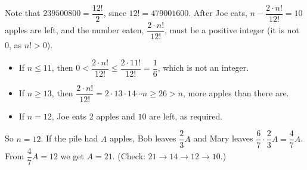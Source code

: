 Note that $239500800=\dfrac{12!}{2}$, since $12!=479001600$. After Joe eats, $n-\dfrac{2\cdot n!}{12!}=10$ apples are left, and the number eaten, $\dfrac{2\cdot n!}{12!}$, must be a positive integer (it is not $0$, as $n!>0$).
\begin{itemize}
\item If $n\le11$, then $0<\dfrac{2\cdot n!}{12!}\le\dfrac{2\cdot11!}{12!}=\dfrac16$, which is not an integer.
\item If $n\ge13$, then $\dfrac{2\cdot n!}{12!}=2\cdot13\cdot14\cdots n\ge26>n$, more apples than there are.
\item If $n=12$, Joe eats $2$ apples and $10$ are left, as required.
\end{itemize}
So $n=12$. If the pile had $A$ apples, Bob leaves $\dfrac23A$ and Mary leaves $\dfrac67\cdot\dfrac23A=\dfrac47A$. From $\dfrac47A=12$ we get $A=\boxed{21}$. (Check: $21\to14\to12\to10$.)
